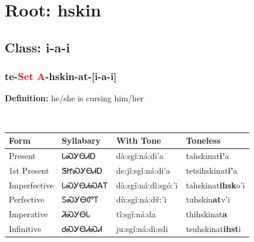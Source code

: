 \needspace{4in}
\section*{Root: hskin}
\nopagebreak
{}
\needspace{3in}
\subsection*{Class: i-a-i}
\nopagebreak
\needspace{2in}
\subsubsection*{te{-}\textcolor{Red}{Set A}{-}\textbf{hskin}{-}at{-}[i-a-i]}
\nopagebreak
\textbf{Definition: } he/she is cursing him/her
\\[0.5em]
\begin{tabularx}{\textwidth}{l X X X}%
\toprule%
\textbf{Form}&\textbf{Syllabary}&\textbf{With Tone}&\textbf{Toneless}\\%
\midrule%
Present&ᏓᏍᎩᎾᏗᎠ&dà:sgǐ:ná:di’a&tahskinat\textbf{i'}a\\%
1st Present&ᏕᏥᏍᎩᎾᏗᎠ&de:jî:sgǐ:ná:di’a&tetsihskinat\textbf{i'}a\\%
Imperfective&ᏓᏍᎩᎾᏗᏍᎪᎢ&dà:sgǐ:ná:dì:sgó:’i&tahskinat\textbf{ihsk}o'i\\%
Perfective&ᏚᏍᎩᎾᏛᎢ&dù:sgǐ:ná:dv̌:’i&tuhskin\textbf{at}v'i\\%
Imperative&ᏘᏍᎩᎾᏓ&tî:sgǐ:ná:da&thihskinat\textbf{a}\\%
Infinitive&ᏧᏍᎩᎾᏗᏍᏗ&ju:sgǐ:ná:dì:sdi&tsuhskinat\textbf{ihst}i\\%
\bottomrule%
\end{tabularx}
\\[1em]